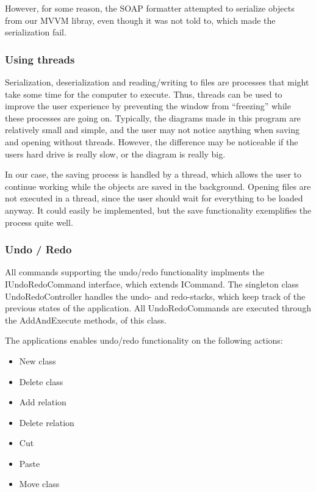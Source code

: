 However, for some reason, the SOAP formatter attempted to serialize objects from
our MVVM libray, even though it was not told to, which made the serialization
fail.

\subsubsection{Using threads}
Serialization, deserialization and reading/writing
to files are processes that might take some time for the computer to execute.
Thus, threads can be used to improve the user experience by preventing the
window from “freezing” while these processes are going on. Typically, the
diagrams made in this program are relatively small and simple, and the user may
not notice anything when saving and opening without threads. However, the
difference may be noticeable if the users hard drive is really slow, or the
diagram is really big.

In our case, the saving process is handled by a thread, which allows the user to
continue working while the objects are saved in the background. Opening files
are not executed in a thread, since the user should wait for everything to be
loaded anyway. It could easily be implemented, but the save functionality
exemplifies the process quite well.


\subsubsection{Undo / Redo}
All commands supporting the undo/redo functionality implments the
IUndoRedoCommand interface, which extends ICommand. The singleton class
UndoRedoController handles the undo- and redo-stacks, which keep track of the
previous states of the application. All UndoRedoCommands are executed through
the AddAndExecute methods, of this class.

The applications enables undo/redo functionality on the following actions:


\begin{itemize}
	\item New class
	\item Delete class
	\item Add relation
	\item Delete relation
	\item Cut
	\item Paste
	\item Move class
\end{itemize}


